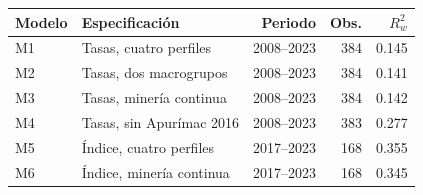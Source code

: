 \begin{tabular}{llrrr}
\toprule
Modelo & Especificación & Periodo & Obs. & $R^2_w$ \\
\midrule
M1 & Tasas, cuatro perfiles & 2008--2023 & 384 & 0.145 \\
M2 & Tasas, dos macrogrupos & 2008--2023 & 384 & 0.141 \\
M3 & Tasas, minería continua & 2008--2023 & 384 & 0.142 \\
M4 & Tasas, sin Apurímac 2016 & 2008--2023 & 383 & 0.277 \\
M5 & Índice, cuatro perfiles & 2017--2023 & 168 & 0.355 \\
M6 & Índice, minería continua & 2017--2023 & 168 & 0.345 \\
\bottomrule
\end{tabular}
